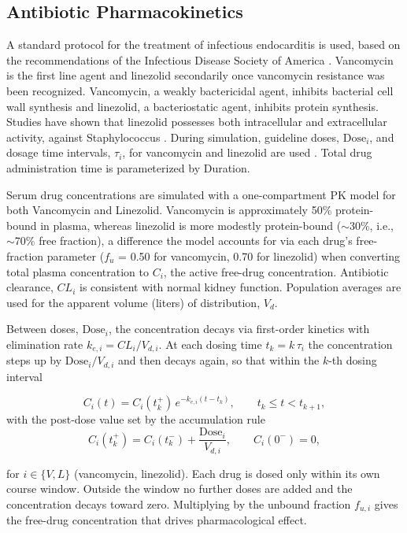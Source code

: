 \documentclass[journal]{IEEEtran}
\begin{document}
\subsection{Antibiotic Pharmacokinetics}
A standard protocol for the treatment of infectious endocarditis is used, based on the recommendations
of the Infectious Disease Society of America \cite{Minter2023}.
Vancomycin is the first line agent and linezolid secondarily once vancomycin resistance was been recognized.
Vancomycin, a weakly bactericidal agent, inhibits bacterial cell wall synthesis and linezolid, a bacteriostatic agent,
inhibits protein synthesis. Studies have shown that linezolid possesses both intracellular and extracellular activity, against Staphylococcus \cite{sandberg2010intra}.
During simulation, guideline doses, $\mathrm{Dose}_{i}$, and dosage time intervals, $\tau_{i}$, for vancomycin and linezolid are used \cite{vancopk_review}.  Total drug administration time is parameterized by Duration.

Serum drug concentrations are simulated with a one-compartment PK model for both Vancomycin and Linezolid.
Vancomycin is approximately 50\% protein-bound in plasma, whereas linezolid is more modestly protein-bound ($\sim$30\%, i.e., $\sim$70\% free fraction), a difference the model accounts for via each drug's free-fraction parameter ($f_u$ = 0.50 for vancomycin, 0.70 for linezolid) when converting total plasma concentration to $C_{i}$, the active free-drug concentration.  Antibiotic clearance, $CL_{i}$ is consistent with normal kidney function. Population averages are used for the apparent volume (liters) of distribution, $V_{d}$.

Between doses, $\mathrm{Dose}_{i}$, the concentration decays via first-order kinetics with elimination rate $k_{e,i} = CL_i / V_{d,i}$. At each dosing time $t_k = k\,\tau_i$ the concentration steps up by $\mathrm{Dose}_i / V_{d,i}$ and then decays again,
so that within the $k$-th dosing interval

\begin{equation}
C_i(t) = C_i(t_k^{+})\, e^{-k_{e,i}(t - t_k)},
\qquad t_k \le t < t_{k+1},
\label{eq:pk}
\end{equation}
with the post-dose value set by the accumulation rule
\begin{equation}
C_i(t_k^{+}) = C_i(t_k^{-}) + \frac{\mathrm{Dose}_i}{V_{d,i}},
\qquad C_i(0^{-}) = 0 ,
\label{eq:pkdose}
\end{equation}

for $i \in \{V, L\}$ (vancomycin, linezolid). Each drug is dosed only within
its own course window. Outside the window no further doses are added and the
concentration decays toward zero. Multiplying by the unbound fraction
$f_{u,i}$ gives the free-drug concentration that drives pharmacological effect.
\end{document}

